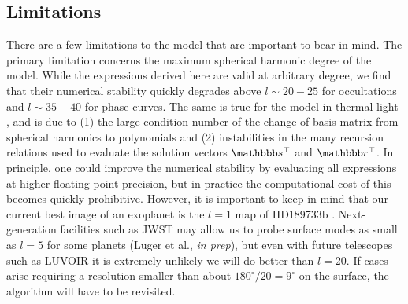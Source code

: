 \documentclass[modern]{aastex62}
\begin{document}
\subsection{Limitations}
\label{sec:limitations}

There are a few limitations to the \starry model that are important
to bear in mind. The primary limitation concerns the maximum spherical
harmonic degree of the model. While the expressions derived here are
valid at arbitrary degree, we find that their numerical stability quickly
degrades above $l \sim 20-25$ for occultations and $l \sim 35-40$ for phase
curves. The same is true for the model in thermal light \citep{Luger2019},
and is due to (1) the large condition number of the change-of-basis matrix
from spherical harmonics to polynomials and (2) instabilities in the
many recursion relations used to evaluate the solution vectors
$\sT$ and $\rT$.
In principle, one could improve the numerical stability by evaluating
all expressions at higher floating-point precision, but in practice
the computational cost of this becomes quickly prohibitive.
However, it is important to keep in mind that our current best image
of an exoplanet is the $l=1$ map of HD189733b
\citep{Knutson2007,Majeau2012,deWit2012}. Next-generation facilities
such as JWST may allow us to probe surface modes as small as $l=5$
for some planets (Luger et al., \emph{in prep}), but even with future
telescopes such as LUVOIR it is extremely unlikely we will do better than
$l=20$. If cases arise requiring a resolution smaller than about
$180^\circ / 20 = 9^\circ$ on the surface, the \starry algorithm
will have to be revisited.
\end{document}
